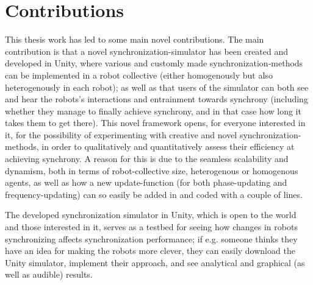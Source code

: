 


\section{Contributions}






This thesis work has led to some main novel contributions. The main contribution is that a novel synchronization-simulator has been created and developed in Unity, where various and customly made synchronization-methods can be implemented in a robot collective (either homogenously but also heterogenously in each robot); as well as that users of the simulator can both see and hear the robots's interactions and entrainment towards synchrony (including whether they manage to finally achieve synchrony, and in that case how long it takes them to get there). This novel framework opens, for everyone interested in it, for the possibility of experimenting with creative and novel synchronization-methods, in order to qualitatively and quantitatively assess their efficiency at achieving synchrony. A reason for this is due to the seamless scalability and dynamism, both in terms of robot-collective size, heterogenous or homogenous agents, as well as how a new update-function (for both phase-updating and frequency-updating) can so easily be added in and coded with a couple of lines.

The developed synchronization simulator in Unity, which is open to the world and those interested in it, serves as a testbed for seeing how changes in robots synchronizing affects synchronization performance; if e.g. someone thinks they have an idea for making the robots more clever, they can easily download the Unity simulator, implement their approach, and see analytical and graphical (as well as audible) results.

